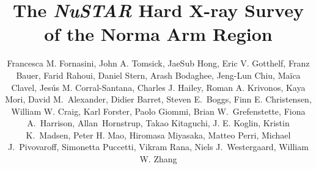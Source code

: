 \documentclass[iop,revtex4]{emulateapj}
\begin{document}
\title{The \textit{NuSTAR} Hard X-ray Survey of the Norma Arm Region}

 


\author{Francesca M. Fornasini, John A. Tomsick, JaeSub Hong, Eric V. Gotthelf, Franz Bauer, Farid Rahoui, Daniel Stern, Arash Bodaghee, Jeng-Lun Chiu, Ma{\"i}ca Clavel, Jes{\'u}s M. Corral-Santana, Charles J. Hailey, Roman A. Krivonos, Kaya Mori,
David M.~Alexander, 
Didier Barret,
Steven E.~Boggs, 
Finn E. Christensen,
William W. Craig,
Karl Forster,
Paolo Giommi,
Brian W.~Grefenstette,
Fiona A.~Harrison,
Allan~Hornstrup,
Takao Kitaguchi,
J. E. Koglin,
Kristin K.~Madsen,
Peter H. Mao,
Hiromasa Miyasaka,
Matteo Perri,
Michael J.~Pivovaroff,
Simonetta Puccetti, 
Vikram Rana,
Niels J.~Westergaard,
William W. Zhang
}
\end{document}
